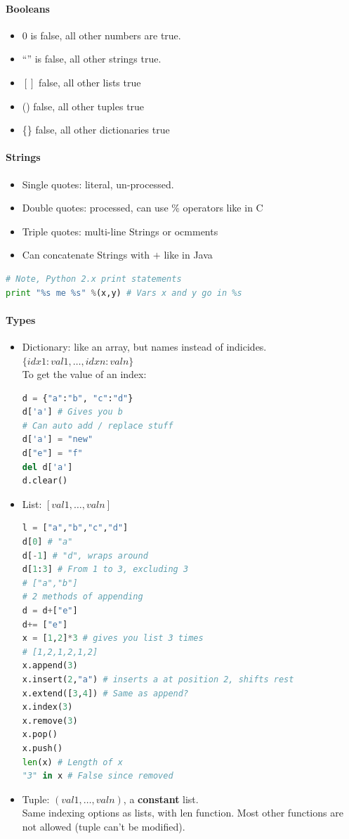 \documentclass[12 pt]{article}
\begin{document}
\paragraph{Booleans}
\begin{itemize}
\item $0$ is false, all other numbers are true.
\item ``'' is false, all other strings true.
\item $[]$ false, all other lists true
\item () false, all other tuples true
  \item \{\} false, all other dictionaries true
\end{itemize}
\paragraph{Strings}
\begin{itemize}
\item Single quotes: literal, un-processed.
\item Double quotes: processed, can use \% operators like in C
  \item Triple quotes: multi-line Strings or ocmments
\item Can concatenate Strings with $+$ like in Java
\end{itemize}
\begin{lstlisting}[language=python]
# Note, Python 2.x print statements
print "%s me %s" %(x,y) # Vars x and y go in %s
\end{lstlisting}
\paragraph{Types}
\begin{itemize}
\item Dictionary: like an array, but names instead of indicides. $\{idx1:val1,\ldots,idxn:valn\}$
  \\ To get the value of an index:
\begin{lstlisting}[language=python]
d = {"a":"b", "c":"d"}
d['a'] # Gives you b
# Can auto add / replace stuff
d['a'] = "new"
d["e"] = "f"
del d['a']
d.clear()
\end{lstlisting}
\item List: $[val1,\ldots,valn]$
\begin{lstlisting}[language=python]
l = ["a","b","c","d"]
d[0] # "a"
d[-1] # "d", wraps around
d[1:3] # From 1 to 3, excluding 3
# ["a","b"]
# 2 methods of appending
d = d+["e"]
d+= ["e"]
x = [1,2]*3 # gives you list 3 times
# [1,2,1,2,1,2]
x.append(3)
x.insert(2,"a") # inserts a at position 2, shifts rest
x.extend([3,4]) # Same as append?
x.index(3)
x.remove(3)
x.pop()
x.push()
len(x) # Length of x
"3" in x # False since removed
\end{lstlisting}
\item Tuple: $(val1,\ldots,valn)$, a \textbf{constant} list.
  \\ Same indexing options as lists, with len function. Most other functions are not allowed (tuple can't be modified).
\end{itemize}
\end{document}

